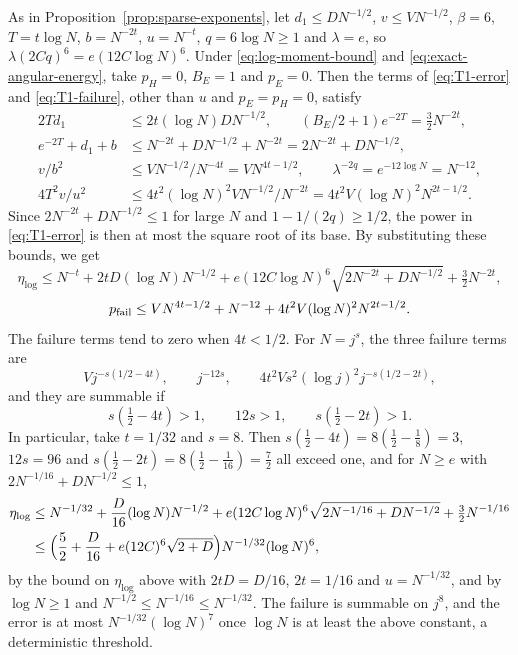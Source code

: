 \begin{remark}\label{rem:T1-powers}
As in Proposition~\ref{prop:sparse-exponents}, let $d_1\leq DN^{-1/2}$,
$v\leq VN^{-1/2}$, $\beta=6$, $T=t\log N$, $b=N^{-2t}$, $u=N^{-t}$,
$q=6\log N\geq1$ and $\lambda=e$, so $\lambda(2Cq)^6=e(12C\log N)^6$.
Under \eqref{eq:log-moment-bound} and \eqref{eq:exact-angular-energy},
take $p_H=0$, $B_E=1$ and $p_E=0$. Then the terms of \eqref{eq:T1-error}
and \eqref{eq:T1-failure}, other than $u$ and $p_E=p_H=0$, satisfy
\begin{align*}
 2Td_1&\leq2t(\log N)DN^{-1/2},\qquad
 (B_E/2+1)e^{-2T}=\tfrac32N^{-2t},\\
 e^{-2T}+d_1+b&\leq N^{-2t}+DN^{-1/2}+N^{-2t}=2N^{-2t}+DN^{-1/2},\\
 v/b^2&\leq VN^{-1/2}/N^{-4t}=VN^{4t-1/2},\qquad
 \lambda^{-2q}=e^{-12\log N}=N^{-12},\\
 4T^2v/u^2&\leq4t^2(\log N)^2VN^{-1/2}/N^{-2t}=4t^2V(\log N)^2N^{2t-1/2}.
\end{align*}
Since $2N^{-2t}+DN^{-1/2}\le1$ for large $N$ and $1-1/(2q)\ge1/2$, the
power in \eqref{eq:T1-error} is then at most the square root of its base.
By substituting these bounds, we get
\[
 \eta_{\log}\leq N^{-t}+2tD(\log N)N^{-1/2}
  +e(12C\log N)^6\sqrt{2N^{-2t}+DN^{-1/2}}
  +\tfrac32N^{-2t},
\]
\[
 p_{\rm fail}\leq VN^{4t-1/2}+N^{-12}
       +4t^2V(\log N)^2N^{2t-1/2}.
\]
The failure terms tend to zero when $4t<1/2$.
For $N=j^s$, the three failure terms are
\[
 Vj^{-s(1/2-4t)},\qquad j^{-12s},\qquad
 4t^2Vs^2(\log j)^2j^{-s(1/2-2t)},
\]
and they are summable if
\[
 s(\tfrac12-4t)>1,\qquad 12s>1,\qquad s(\tfrac12-2t)>1.
\]
In particular, take $t=1/32$ and $s=8$.
Then $s(\frac12-4t)=8(\frac12-\frac18)=3$, $12s=96$ and
$s(\frac12-2t)=8(\frac12-\frac1{16})=\frac72$ all exceed one, and for $N\geq e$
with $2N^{-1/16}+DN^{-1/2}\le1$,
\begin{align*}
 \eta_{\log}
 &\leq N^{-1/32}+\frac D{16}(\log N)N^{-1/2}
  +e(12C\log N)^6\sqrt{2N^{-1/16}+DN^{-1/2}}
  +\tfrac32N^{-1/16}\\
 &\leq\Bigl(\frac52+\frac D{16}+e(12C)^6\sqrt{2+D}\Bigr)
       N^{-1/32}(\log N)^6,
\end{align*}
by the bound on $\eta_{\log}$ above with $2tD=D/16$, $2t=1/16$ and
$u=N^{-1/32}$, and by $\log N\geq1$ and
$N^{-1/2}\leq N^{-1/16}\leq N^{-1/32}$.
The failure is summable on $j^8$, and the error is at most
$N^{-1/32}(\log N)^7$ once $\log N$ is at least the above constant, a
deterministic threshold.


\end{remark}

